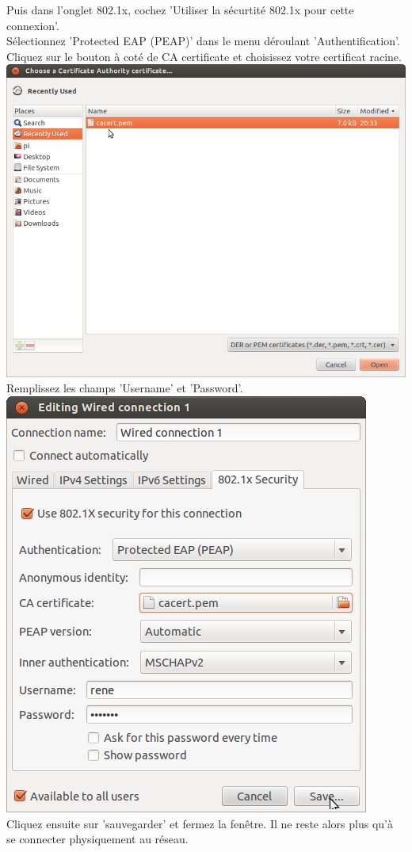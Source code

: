 Puis dans l'onglet 802.1x, cochez 'Utiliser la sécurtité 802.1x pour cette connexion'.\\
Sélectionnez 'Protected EAP (PEAP)' dans le menu déroulant 'Authentification'. 
Cliquez sur le bouton à coté de CA certificate et choisissez votre certificat racine.\\
\includegraphics[width=\screenShotSize{}]{imgUser/selectCacert.png}\\
Remplissez les champs 'Username' et 'Password'.\\
\includegraphics[width=\screenShotSize{}]{imgUser/peap.png}\\
Cliquez ensuite sur 'sauvegarder' et fermez la fenêtre.
Il ne reste alors plus qu'à se connecter physiquement au réseau.\\

